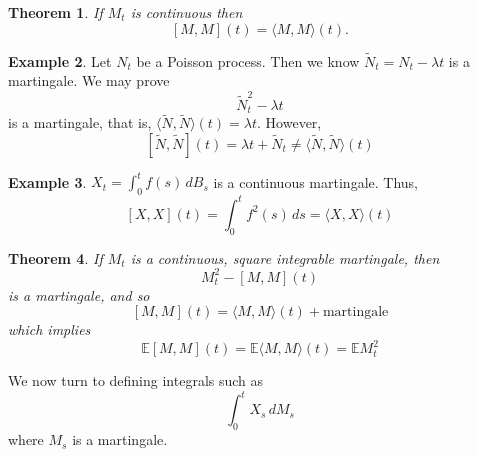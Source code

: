 \documentclass[10pt, oneside, reqno]{amsart}
\theoremstyle{plain}%
\newtheorem{thm}{Theorem}[section]
\theoremstyle{definition}
\newtheorem{exmp}[thm]{Example}
\theoremstyle{remark}
\newcommand{\E}{\mathbb{E}}
\begin{document}
\begin{thm}
    If $M_t$ is continuous then \[
        [M, M](t) = \langle M , M \rangle (t).
    \]
\end{thm}

\begin{exmp}
    Let $N_t$ be a Poisson process.  Then we know $\tilde N_t = N_t - \lambda t$ is a martingale.  We may prove \[
        \tilde N_t^2 - \lambda t
    \] is a martingale, that is, $\langle \tilde N, \tilde N \rangle(t)=\lambda t$.  However, \[
        [\tilde N, \tilde N](t) = \lambda t + \tilde N_t \neq \langle \tilde N, \tilde N \rangle (t)
    \]
\end{exmp}
\begin{exmp}
    $X_t = \int_0^t f(s) \, dB_s$ is a continuous martingale.  Thus, \[
        [X, X](t) = \int_0^t f^2(s) \, ds = \langle X, X \rangle(t)
    \]  
\end{exmp}

\begin{thm}
    If $M_t$ is a continuous, square integrable martingale, then \[
        M_t^2 - [M, M](t)
    \] is a martingale, and so \[
        [M, M](t) = \langle M, M \rangle(t) + \text{martingale}
    \] which implies \[
        \E[M, M](t) = \E\langle M , M \rangle(t) = \E M_t^2
    \]
\end{thm}


We now turn to defining integrals such as \[
    \int_0^t X_s \, dM_s
\] where $M_s$ is a martingale.
\end{document}
